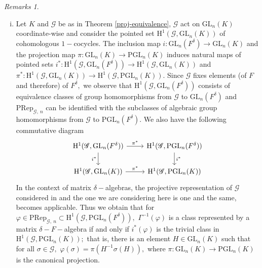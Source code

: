 \documentclass[preprint, 11pt]{amsart}
\theoremstyle{corollary}
\theoremstyle{remark}
\newtheorem*{remarks*}{Remarks}
\theoremstyle{proposition}
\numberwithin{equation}{subsection}
\begin{document}
	\begin{remarks*}
		
	\item \begin{enumerate}[(i)]
		\item Let $K$ and $\mathscr G$ be as in Theorem \ref{proj-equivalence},  $\mathscr G$ act on $\mathrm{GL}_n(K)$ coordinate-wise and consider the pointed set $\mathrm H^1(\mathscr G, \mathrm{GL}_n(K))$ of cohomologous $1-$cocycles. The inclusion map $i: \mathrm{GL}_n(F^\delta)\to \mathrm{GL}_n(K)$ and the projection map $\pi: \mathrm{GL}_n(K)\to \mathrm{PGL}_n(K)$ induces natural maps of pointed sets $i^*: \mathrm{H}^1(\mathscr G, \mathrm{GL}_n(F^\delta))\to \mathrm{H}^1(\mathscr G, \mathrm{GL}_n(K))$ and $\pi^*: \mathrm{H}^1(\mathscr G, \mathrm{GL}_n(K))\to \mathrm{H}^1(\mathscr G, \mathrm{PGL}_n(K)).$  Since $\mathscr G$ fixes elements (of $F$ and therefore) of $F^\delta,$ we observe that $\mathrm{H}^1(\mathscr G, \mathrm{GL}_n(F^\delta))$ consists of  equivalence classes of group homomorphisms from $\mathscr G$ to $\mathrm{GL}_n(F^\delta)$ and $\mathrm{PRep}_{\mathscr G, \ n}$  can be identified with the subclasses of algebraic group homomorphisms from $\mathscr G$ to $\mathrm{PGL}_n(F^\delta).$ We also have the following commutative diagram \[\begin{tikzcd}\mathrm{H}^1(\mathscr G,\mathrm{GL}_n(F^\delta)) \arrow{r}{\pi^*} \arrow[swap]{d}{i^*} & \mathrm{H}^1(\mathscr G,\mathrm{PGL}_n(F^\delta)) \arrow{d}{i^*} \\	\mathrm{H}^1(\mathscr G,\mathrm{GL}_n(K)) \arrow{r}{\pi^*} & \mathrm{H}^1(\mathscr G,\mathrm{PGL}_n(K))	\end{tikzcd}	\]
		In the context of matrix $\delta-$algebras, the projective representation of $\mathscr G$ considered in \cite{JM08} and the one we are considering here is one and the same,  \cite[Theorem 2]{JM08} becomes applicable. Thus we obtain that  for $\varphi\in \mathrm{PRep}_{\mathscr G, \ n}\subset \mathrm{H}^1(\mathscr G,\mathrm{PGL}_n(F^\delta)),$ $\Gamma^{-1}(\varphi)$ is a class represented by a matrix $\delta-F-$algebra if and only if $i^*(\varphi)$  is the trivial class in $\mathrm{H}^1(\mathscr G,\mathrm{PGL}_n(K));$ that is,    there is an element $H\in \mathrm{GL}_n(K)$ such that for all $\sigma\in\mathscr G,$ $\varphi(\sigma)=\pi(H^{-1}\sigma(H)),$ where $\pi:  \mathrm{GL}_n(K)\to \mathrm{PGL}_n(K)$ is the canonical projection. \\

\end{enumerate}
\end{remarks*}
\end{document}
